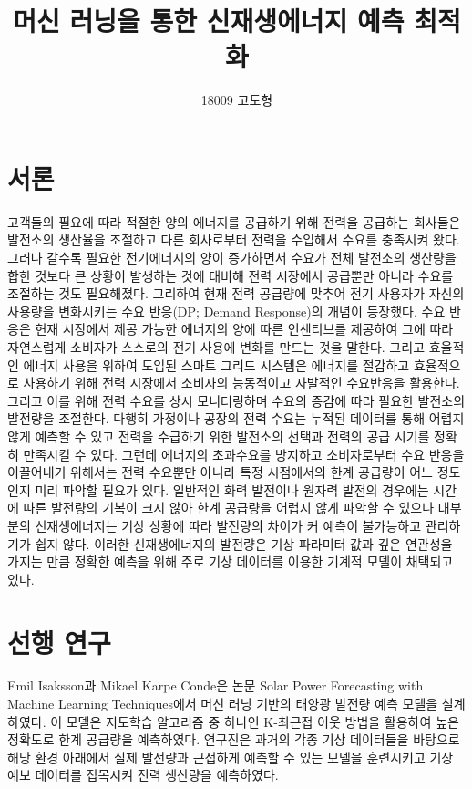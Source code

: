\documentclass{article}
\begin{document}

\title{머신 러닝을 통한 신재생에너지 예측 최적화}
\author{18009 고도형}
\maketitle

\section{서론}
고객들의 필요에 따라 적절한 양의 에너지를 공급하기 위해 전력을 공급하는 회사들은 발전소의 생산율을 조절하고 다른 회사로부터 전력을 수입해서 수요를 충족시켜 왔다. 그러나 갈수록 필요한 전기에너지의 양이 증가하면서 수요가 전체 발전소의 생산량을 합한 것보다 큰 상황이 발생하는 것에 대비해 전력 시장에서 공급뿐만 아니라 수요를 조절하는 것도 필요해졌다. 그리하여 현재 전력 공급량에 맞추어 전기 사용자가 자신의 사용량을 변화시키는 수요 반응(DP; Demand Response)의 개념이 등장했다. 수요 반응은 현재 시장에서 제공 가능한 에너지의 양에 따른 인센티브를 제공하여 그에 따라 자연스럽게 소비자가 스스로의 전기 사용에 변화를 만드는 것을 말한다. 그리고 효율적인 에너지 사용을 위하여 도입된 스마트 그리드 시스템은 에너지를 절감하고 효율적으로 사용하기 위해 전력 시장에서 소비자의 능동적이고 자발적인 수요반응을 활용한다. 그리고 이를 위해 전력 수요를 상시 모니터링하며 수요의 증감에 따라 필요한 발전소의 발전량을 조절한다. 다행히 가정이나 공장의 전력 수요는 누적된 데이터를 통해 어렵지 않게 예측할 수 있고 전력을 수급하기 위한 발전소의 선택과 전력의 공급 시기를 정확히 만족시킬 수 있다. \newline
그런데 에너지의 초과수요를 방지하고 소비자로부터 수요 반응을 이끌어내기 위해서는 전력 수요뿐만 아니라 특정 시점에서의 한계 공급량이 어느 정도인지 미리 파악할 필요가 있다. 일반적인 화력 발전이나 원자력 발전의 경우에는 시간에 따른 발전량의 기복이 크지 않아 한계 공급량을 어렵지 않게 파악할 수 있으나 대부분의 신재생에너지는 기상 상황에 따라 발전량의 차이가 커 예측이 불가능하고 관리하기가 쉽지 않다. 이러한 신재생에너지의 발전량은 기상 파라미터 값과 깊은 연관성을 가지는 만큼 정확한 예측을 위해 주로 기상 데이터를 이용한 기계적 모델이 채택되고 있다.

\section{선행 연구}
Emil Isaksson과 Mikael Karpe Conde은 논문 Solar Power Forecasting with Machine Learning Techniques에서 머신 러닝 기반의 태양광 발전량 예측 모델을 설계하였다. 이 모델은 지도학습 알고리즘 중 하나인 K-최근접 이웃 방법을 활용하여 높은 정확도로 한계 공급량을 예측하였다. 연구진은 과거의 각종 기상 데이터들을 바탕으로 해당 환경 아래에서 실제 발전량과 근접하게 예측할 수 있는 모델을 훈련시키고 기상 예보 데이터를 접목시켜 전력 생산량을 예측하였다.
\end{document}

